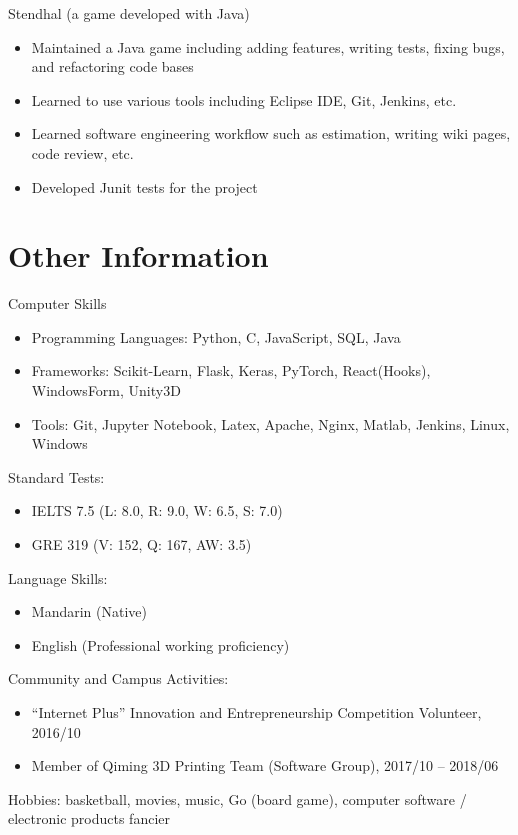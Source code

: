 \documentclass{resume}
\begin{document}

Stendhal (a game developed with Java)
\begin{itemize}
    \item Maintained a Java game including adding features, writing tests, fixing bugs, and refactoring code bases
    \item Learned to use various tools including Eclipse IDE, Git, Jenkins, etc.
    \item Learned software engineering workflow such as estimation, writing wiki pages, code review, etc.
    \item Developed Junit tests for the project
\end{itemize}

\section{Other Information}
Computer Skills
\begin{itemize}
    \item Programming Languages: Python, C, JavaScript, SQL, Java
    \item Frameworks: Scikit-Learn, Flask, Keras, PyTorch, React(Hooks), WindowsForm, Unity3D
    \item Tools: Git, Jupyter Notebook, Latex, Apache, Nginx, Matlab, Jenkins, Linux, Windows
\end{itemize}

Standard Tests:
\begin{itemize}
    \item IELTS 7.5 (L: 8.0, R: 9.0, W: 6.5, S: 7.0)
    \item GRE 319 (V: 152, Q: 167, AW: 3.5)
\end{itemize}

Language Skills:
\begin{itemize}
    \item Mandarin (Native)
    \item English (Professional working proficiency)
\end{itemize}

Community and Campus Activities: 
\begin{itemize}
    \item “Internet Plus” Innovation and Entrepreneurship Competition Volunteer, 2016/10
    \item Member of Qiming 3D Printing Team (Software Group), 2017/10 -- 2018/06
\end{itemize}

Hobbies: basketball, movies, music, Go (board game), computer software / electronic products fancier
\end{document}
